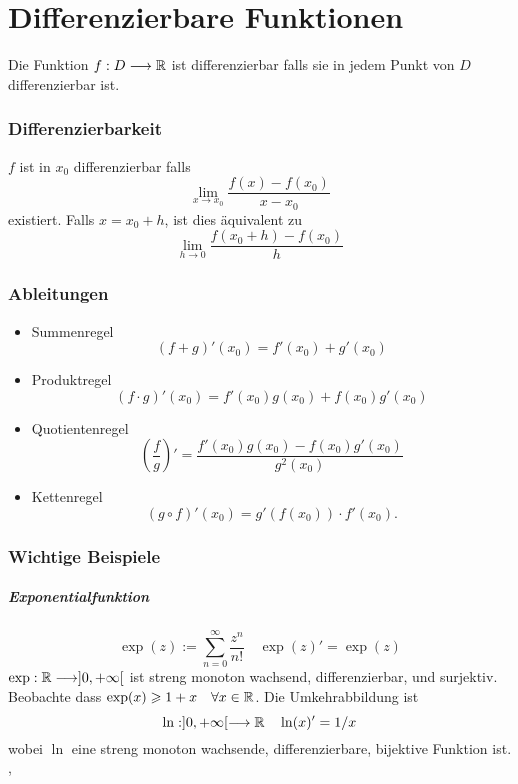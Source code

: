 \part{Differenzierbare Funktionen}
\setcounter{section}{0}
\Def Die Funktion $f: D \longrightarrow \mathbb{R}$ ist differenzierbar falls sie in jedem Punkt von $D$ differenzierbar ist.

\section{Differenzierbarkeit}

\Def $f$ ist in $x_0$ differenzierbar falls 
$$\lim \limits_{x \rightarrow x_{0}} \frac{f(x)-f\left(x_{0}\right)}{x-x_{0}}$$
existiert. Falls $x=x_0+h$, ist dies äquivalent zu
$$\lim \limits_{h \rightarrow 0} \frac{f\left(x_{0}+h\right)-f\left(x_{0}\right)}{h}$$

\section{Ableitungen}
\Satz[Ableitungsregeln]
\begin{itemize}
  \item Summenregel
  \[(f+g)'(x_0) = f'(x_0) + g'(x_0)\]
  \item Produktregel
  \[(f\cdot g)'(x_0) = f'(x_0)g(x_0) + f(x_0)g'(x_0)\]
  \item Quotientenregel
  \[\left(\frac{f}{g}\right)'=
  \frac{f'(x_0)g(x_0) - f(x_0)g'(x_0)}{g^2(x_0)}\]
  \item Kettenregel \[
	(g\circ f)'(x_0) = g'(f(x_0))\cdot f'(x_0).
  \]
\end{itemize}





\section{Wichtige Beispiele}
\subsubsection{Exponentialfunktion}
$$\exp (z):=\sum_{n=0}^{\infty} \frac{z^{n}}{n !} \quad \exp (z)' = \exp(z)$$
$\exp : \mathbb{R} \longrightarrow] 0,+\infty[$ ist streng monoton wachsend, differenzierbar, und surjektiv. Beobachte dass $\exp (x) \geqslant 1+x \quad \forall x \in \mathbb{R}$.
Die Umkehrabbildung ist 
$$\ln :] 0,+\infty[\longrightarrow \mathbb{R} \quad \ln (x)' = 1/x$$
wobei $\ln$ eine streng monoton wachsende, differenzierbare, bijektive Funktion ist.
\sep
